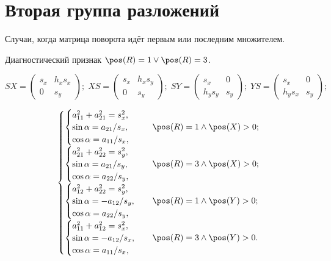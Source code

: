 \section{Вторая группа разложений}

Случаи, когда матрица поворота идёт первым или последним множителем.

Диагностический признак $\pos(R)=1 \vee \pos(R)=3 $.

$$
SX = \begin{pmatrix}s_x & h_xs_x \\ 0 & s_y\end{pmatrix};\;
XS = \begin{pmatrix}s_x & h_xs_y \\ 0 & s_y\end{pmatrix};\;
SY = \begin{pmatrix}s_x & 0 \\ h_ys_y & s_y\end{pmatrix};\;
YS = \begin{pmatrix}s_x & 0 \\ h_ys_x & s_y\end{pmatrix};
$$

$$
\begin{cases}
	\begin{cases}
		a_{11}^2 + a_{21}^2 = s_x^2, \\
		\sin\alpha = a_{21}/s_x,\\
		\cos\alpha = a_{11}/s_x,
	\end{cases} & \pos(R)=1 \wedge \pos(X)>0;\\
	\begin{cases}
		a_{21}^2 + a_{22}^2 = s_y^2, \\
		\sin\alpha = a_{21}/s_y,\\
		\cos\alpha = a_{22}/s_y,
	\end{cases} & \pos(R)=3 \wedge \pos(X)>0;\\
	\begin{cases}
		a_{12}^2 + a_{22}^2 = s_y^2,\\
		\sin\alpha = -a_{12}/s_y,\\
		\cos\alpha = a_{22}/s_y,
	\end{cases} & \pos(R)=1 \wedge \pos(Y)>0;\\
	\begin{cases}
		a_{11}^2 + a_{12}^2 = s_x^2,\\
		\sin\alpha = -a_{12}/s_x,\\
		\cos\alpha = a_{11}/s_x,
	\end{cases} & \pos(R)=3 \wedge \pos(Y)>0.\\
\end{cases}
$$

